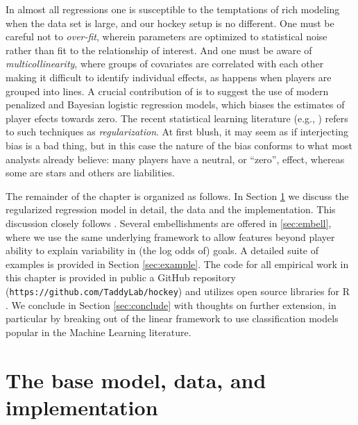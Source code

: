 In almost all regressions one is susceptible to the temptations of rich
modeling when the data set is large, and our hockey setup is no different. One
must be careful not to {\em over-fit}, wherein parameters are optimized to
statistical noise rather than fit to the relationship of interest.  And one
must be aware of {\em multicollinearity}, where groups of covariates are
correlated with each other making it difficult to identify individual effects,
as happens when players are grouped into lines.  A crucial contribution of
\cite{gramacy:jensen:taddy:2013} is to suggest the use of modern penalized and
Bayesian logistic regression models, which biases the estimates of player
efects towards zero.  The recent statistical learning literature (e.g.,
\cite{hastie:tibsh:fried:2001}) refers to such techniques as {\em
regularization}.  At first blush, it may seem as if interjecting bias is a bad
thing, but in this case the nature of the bias conforms to what most analysts
already believe: many players have a neutral, or ``zero'', effect, whereas
some are stars and others are liabilities.  

The remainder of the chapter is organized as follows.  In Section
\ref{sec:base} we discuss the regularized regression model in detail, the data
and the implementation.  This discussion closely follows
\cite{gramacy:jensen:taddy:2013}.  Several embellishments are offered in
\ref{sec:embell}, where we use the same underlying framework to allow
features beyond player ability to explain variability in (the log odds of)
goals. A detailed suite of examples is provided in Section \ref{sec:example}.
The code for all empirical work in this chapter is provided in public a GitHub
repository (\verb!https://github.com/TaddyLab/hockey!) and utilizes open
source libraries for {\sf R} \cite{cranR}.  We conclude in Section
\ref{sec:conclude} with thoughts on further extension, in particular by
breaking out of the linear framework to use classification models
popular in the Machine Learning literature.

\section{The base model, data, and implementation}
\label{sec:base}


